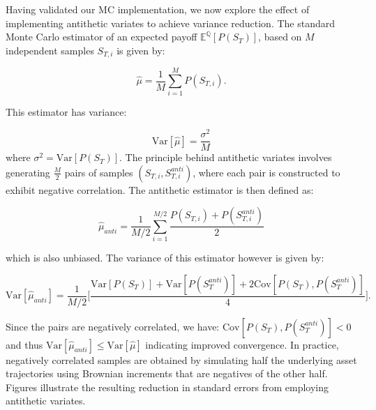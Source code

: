 

Having validated our MC implementation, we now explore the effect of implementing
antithetic variates to achieve variance reduction. The standard Monte Carlo estimator of an 
expected payoff
$\mathbb{E}^{\mathbb{Q}}[P(S_T)]$, 
based on $M$ independent samples $S_{T,i}$ is given by:

\begin{equation*}
    \hat{\mu} = \frac{1}{M} \sum_{i=1}^{M}P(S_{T,i}).
\end{equation*}

This estimator has variance:

\begin{equation*}
    \mathrm{Var}[\hat{\mu}] = \frac{\sigma^2}{M}
\end{equation*}
where $\sigma^2 = \mathrm{Var}[P(S_{T})]$. The principle behind antithetic variates involves
 generating $\frac{M}{2}$ pairs of samples $(S_{T,i}, S_{T,i}^{anti})$, where each pair is
  constructed to exhibit negative correlation. The antithetic estimator is then defined as:

\begin{equation}
    \hat{\mu}_{anti} = \frac{1}{M/2} \sum_{i=1}^{M/2}\frac{P(S_{T,i}) + P(S_{T,i}^{anti})}{2}
\end{equation}

which is also unbiased. The variance of this estimator however is given by:

\begin{equation}
    \mathrm{Var}[\hat{\mu}_{anti}] = \frac{1}{M/2} \bigg[\frac{\mathrm{Var}[P(S_T)] + 
    \mathrm{Var}[P(S_T^{anti})] + 2\mathrm{Cov}[P(S_T), P(S_T^{anti})]}{4}\bigg].
\end{equation}

Since the pairs are negatively correlated, we have:
 $\mathrm{Cov}[P(S_T), P(S_T^{anti})] < 0$ and thus 
 $\mathrm{Var}[\hat{\mu}_{anti}] \le \mathrm{Var}[\hat{\mu}]$ indicating improved convergence.
In practice, negatively correlated samples are obtained by simulating half the underlying asset
trajectories using Brownian increments that are negatives of the other half. Figures
illustrate the resulting reduction in standard errors from employing antithetic variates.

